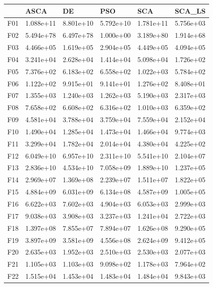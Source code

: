 \begin{tabular}{llllll}
\toprule
{} &       ASCA &         DE &        PSO &        SCA &     SCA\_LS \\
\midrule
F01  &  1.088e+11 &  8.801e+10 &  5.792e+10 &  1.781e+11 &  5.756e+03 \\
F02  &  5.494e+78 &  6.497e+78 &  1.000e+00 &  3.189e+80 &  1.914e+68 \\
F03  &  4.466e+05 &  1.619e+05 &  2.904e+05 &  4.449e+05 &  4.094e+05 \\
F04  &  3.241e+04 &  2.628e+04 &  1.414e+04 &  5.098e+04 &  1.726e+02 \\
F05  &  7.376e+02 &  6.183e+02 &  6.558e+02 &  1.022e+03 &  5.784e+02 \\
F06  &  1.122e+02 &  9.915e+01 &  9.141e+01 &  1.276e+02 &  8.408e+01 \\
F07  &  1.355e+03 &  1.240e+03 &  1.262e+03 &  5.190e+03 &  2.317e+03 \\
F08  &  7.658e+02 &  6.608e+02 &  6.316e+02 &  1.010e+03 &  6.359e+02 \\
F09  &  4.581e+04 &  3.788e+04 &  3.759e+04 &  7.559e+04 &  2.152e+04 \\
F10  &  1.490e+04 &  1.285e+04 &  1.473e+04 &  1.466e+04 &  9.774e+03 \\
F11  &  3.299e+04 &  1.782e+04 &  2.014e+04 &  4.380e+04 &  4.225e+02 \\
F12  &  6.049e+10 &  6.957e+10 &  2.311e+10 &  5.541e+10 &  2.104e+07 \\
F13  &  2.836e+10 &  4.534e+10 &  7.058e+09 &  1.889e+10 &  1.237e+05 \\
F14  &  2.969e+07 &  1.369e+08 &  2.239e+07 &  1.511e+07 &  1.822e+05 \\
F15  &  4.884e+09 &  6.031e+09 &  6.134e+08 &  4.587e+09 &  1.005e+05 \\
F16  &  6.622e+03 &  7.602e+03 &  4.904e+03 &  6.053e+03 &  2.999e+03 \\
F17  &  9.038e+03 &  3.908e+03 &  3.237e+03 &  1.241e+04 &  2.722e+03 \\
F18  &  1.397e+08 &  7.855e+07 &  7.894e+07 &  1.626e+08 &  9.290e+05 \\
F19  &  3.897e+09 &  3.581e+09 &  4.556e+08 &  2.624e+09 &  9.412e+05 \\
F20  &  2.635e+03 &  1.952e+03 &  2.510e+03 &  2.530e+03 &  2.077e+03 \\
F21  &  1.105e+03 &  1.103e+03 &  9.098e+02 &  1.178e+03 &  7.964e+02 \\
F22  &  1.515e+04 &  1.453e+04 &  1.483e+04 &  1.484e+04 &  9.843e+03 \\

\end{tabular}
